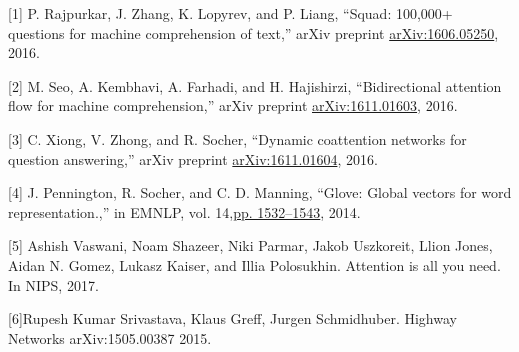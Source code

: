 \documentclass{article} %
\begin{document}
\small{

[1] P. Rajpurkar, J. Zhang, K. Lopyrev, and P. Liang, “Squad: 100,000+ questions for machine comprehension of text,” arXiv preprint \href{https://arxiv.org/abs/1606.05250}{arXiv:1606.05250}, 2016.

[2] M. Seo, A. Kembhavi, A. Farhadi, and H. Hajishirzi, “Bidirectional attention flow for machine comprehension,” arXiv preprint \href{https://arxiv.org/abs/1611.01603}{arXiv:1611.01603}, 2016.

[3] C. Xiong, V. Zhong, and R. Socher, “Dynamic coattention networks for question answering,” arXiv preprint \href{https://arxiv.org/abs/1611.01604}{arXiv:1611.01604}, 2016.

[4] J. Pennington, R. Socher, and C. D. Manning, “Glove: Global vectors for word representation.,” in EMNLP, vol. 14,\href{https://nlp.stanford.edu/pubs/glove.pdf}{pp. 1532–1543}, 2014.

[5] Ashish Vaswani, Noam Shazeer, Niki Parmar, Jakob Uszkoreit, Llion Jones, Aidan N. Gomez,
Lukasz Kaiser, and Illia Polosukhin. Attention is all you need. In NIPS, 2017.

[6]Rupesh Kumar Srivastava, Klaus Greff, Jurgen Schmidhuber. Highway Networks 	arXiv:1505.00387 2015.
}
\end{document}
